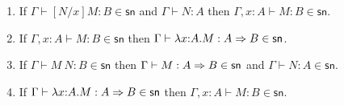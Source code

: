 \documentclass{article}
\newcommand{\csn}{\mathsf{sn}}
\begin{document}
\begin{lemma}\label{lem:psn}$\;$
  \begin{enumerate}
  \item\label{pp3} If $\Gamma \vdash [N/x]M : B \in \csn$ and $\Gamma \vdash N : A$ then $\Gamma, x{:}A \vdash M : B \in \csn$.
  \item\label{pp4} If $\Gamma, x{:}A \vdash M : B \in \csn$ then $\Gamma \vdash  \lambda x{:}A.M : A \arrow B \in \csn$.
  \item\label{pp6} If $\Gamma \vdash M~N : B \in \csn$ then
     $\Gamma \vdash M : A \arrow B \in \csn$ and $\Gamma \vdash N : A\in \csn$.
  \item\label{pp7} If $\Gamma \vdash \lambda x{:}A.M : A \arrow B \in \csn$
     then $\Gamma, x{:}A \vdash M : B \in \csn$.
  \end{enumerate}
\end{lemma}
\end{document}
